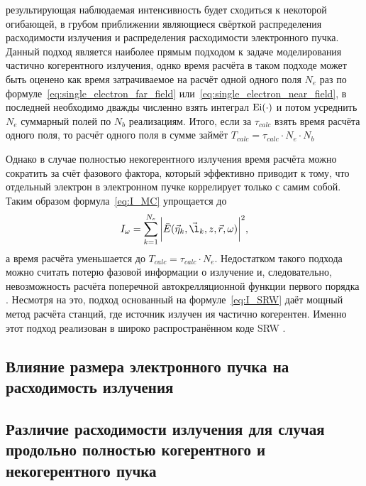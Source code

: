 результирующая наблюдаемая интенсивность будет сходиться к некоторой огибающей, в грубом приближении являющиеся свёрткой распределения расходимости излучения и распределения расходимости электронного пучка. Данный подход является наиболее прямым подходом к задаче моделирования частично когерентного излучения, однко время расчёта в таком подходе может быть оценено как время затрачиваемое на расчёт одной одного поля $N_e$ раз по формуле~\ref{eq:single_electron_far_field} или~\ref{eq:single_electron_near_field}, в последней необходимо дважды численно взять интеграл $\textup{Ei}(\cdot)$ и потом усреднить $N_e$ суммарный полей по $N_b$ реализациям. Итого, если за $\tau_{calc}$ взять время расчёта одного поля, то расчёт одного поля в сумме займёт $T_{calc} = \tau_{calc} \cdot N_e \cdot N_b$ 

Однако в случае полностью некогерентного излучения время расчёта можно сократить за счёт фазового фактора, который эффективно приводит к тому, что отдельный электрон в электронном пучке коррелирует только с самим собой. Таким образом формула~\ref{eq:I_MC} упрощается до 
\begin{align}
 	I_{\omega} = \sum\limits_{k=1}^{N_e} \bigg|\bar{E}(\vec{\eta}_k, \vec{\l}_k, z, \vec{r}, \omega)\bigg|^2,
 	\label{eq:I_SRW} 
\end{align}
а время расчёта уменьшается до $T_{calc} = \tau_{calc} \cdot N_e$. Недостатком такого подхода можно считать потерю фазовой информации о излучение и, следовательно, невозможность расчёта поперечной автокрелляционной функции первого порядка . Несмотря на это, подход основанный на формуле~\ref{eq:I_SRW} даёт мощный метод расчёта станций, где источник излучен ия частично когерентен. Именно этот подход реализован в широко распространённом коде SRW .
 
\subsection{Влияние размера электронного пучка на расходимость излучения}

\subsection{Различие расходимости излучения для случая продольно полностью когерентного и некогерентного пучка}

